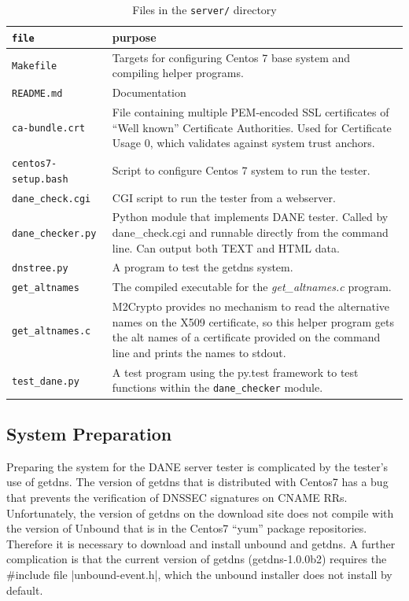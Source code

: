 \documentclass[preprint,3p]{elsarticle}
\begin{document}
\begin{table}
\begin{tabularx}{\textwidth}{>{\tt}lX}
file & purpose\\
\hline
Makefile & Targets for configuring Centos 7 base system and compiling helper programs. \\
README.md & Documentation \\
ca-bundle.crt & File containing multiple PEM-encoded SSL certificates of ``Well known'' Certificate Authorities. Used for Certificate Usage 0, which validates against system trust anchors. \\
centos7-setup.bash & Script to configure Centos 7 system to run the tester. \\
dane\_check.cgi & CGI script to run the tester from a webserver.\\
dane\_checker.py & Python module that implements DANE tester. Called by dane\_check.cgi and runnable directly from the command line. Can output both TEXT and HTML data.\\
dnstree.py & A program to test the getdns system.\\
get\_altnames & The compiled executable for the \emph{get\_altnames.c} program.\\
get\_altnames.c & M2Crypto provides no mechanism to read the alternative names on the X509 certificate, so this helper program gets the alt names of a certificate provided on the command line and prints the names to stdout.\\
test\_dane.py & A test program using the py.test framework to test functions within the {\tt dane\_checker} module.\\
\end{tabularx}
\caption{Files in the \texttt{server/} directory}\label{tlsa}
\end{table}

\subsection{System Preparation}

Preparing the system for the DANE server tester is complicated by the
tester's use of getdns. The version of getdns that is distributed with
Centos7 has a bug that prevents the verification of DNSSEC signatures
on CNAME RRs. Unfortunately, the version of getdns on the download
site does not compile with the version of Unbound that is in the
Centos7 ``yum'' package repositories. Therefore it is necessary to
download and install unbound and getdns. A further complication is
that the current version of getdns (getdns-1.0.0b2) requires the
\#include file |unbound-event.h|, which the unbound installer does not
install by default. 
\end{document}
